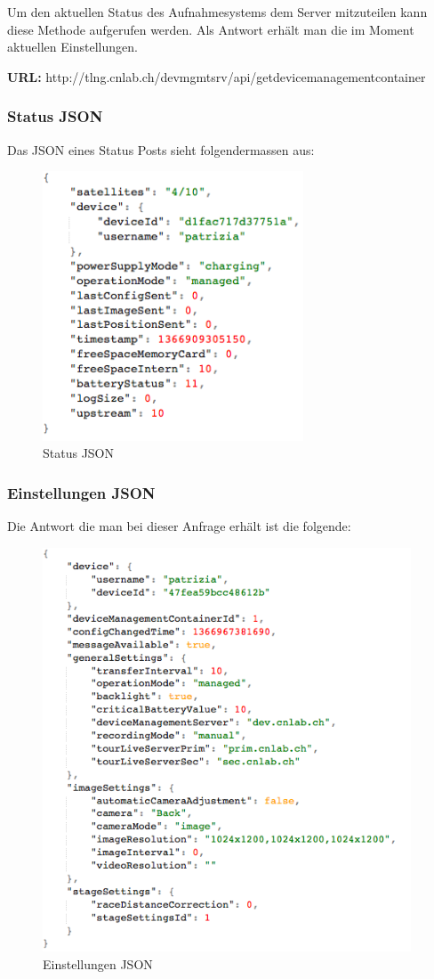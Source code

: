 Um den aktuellen Status des Aufnahmesystems dem Server mitzuteilen kann diese Methode aufgerufen werden. Als Antwort erhält man die im Moment aktuellen Einstellungen.

{\bf URL: }http://tlng.cnlab.ch/devmgmtsrv/api/getdevicemanagementcontainer 

\subsubsection{Status JSON}

Das JSON eines Status Posts sieht folgendermassen aus:

\begin{figure}[h]
	\centering
	\caption{Status JSON}
	\includegraphics[height=80mm]{images/StatusJson.png}
\end{figure}


\subsubsection{Einstellungen JSON}

Die Antwort die man bei dieser Anfrage erhält ist die folgende:

\begin{figure}[H]
	\centering
	\caption{Einstellungen JSON}
	\includegraphics[height=120mm]{images/SettingsJson.png}
\end{figure}


